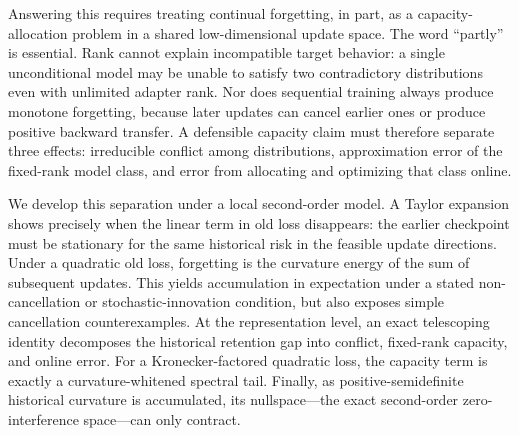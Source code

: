Answering this requires treating continual forgetting, in part, as a
capacity-allocation problem in a shared low-dimensional update space. The word
``partly'' is essential. Rank cannot explain incompatible target behavior: a
single unconditional model may be unable to satisfy two contradictory
distributions even with unlimited adapter rank. Nor does sequential training
always produce monotone forgetting, because later updates can cancel earlier
ones or produce positive backward transfer. A defensible capacity claim must
therefore separate three effects: irreducible conflict among distributions,
approximation error of the fixed-rank model class, and error from allocating and
optimizing that class online.

We develop this separation under a local second-order model. A Taylor expansion
shows precisely when the linear term in old loss disappears: the earlier
checkpoint must be stationary for the same historical risk in the feasible
update directions. Under a quadratic old loss, forgetting is the curvature
energy of the sum of subsequent updates. This yields accumulation in
expectation under a stated non-cancellation or stochastic-innovation condition,
but also exposes simple cancellation counterexamples. At the representation
level, an exact telescoping identity decomposes the historical retention gap
into conflict, fixed-rank capacity, and online error. For a Kronecker-factored
quadratic loss, the capacity term is exactly a curvature-whitened spectral tail.
Finally, as positive-semidefinite historical curvature is accumulated, its
nullspace---the exact second-order zero-interference space---can only contract.

